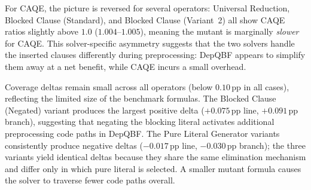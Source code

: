 For CAQE, the picture is reversed for several operators: Universal Reduction,
Blocked Clause (Standard), and Blocked Clause (Variant~2) all show CAQE ratios
slightly above $1.0$ ($1.004$--$1.005$), meaning the mutant is marginally
\emph{slower} for CAQE\@. This solver-specific asymmetry suggests that the two
solvers handle the inserted clauses differently during preprocessing: DepQBF
appears to simplify them away at a net benefit, while CAQE incurs a small
overhead.

Coverage deltas remain small across all operators (below $0.10\,\text{pp}$
in all cases), reflecting the limited size of the benchmark formulas.
The Blocked Clause (Negated) variant produces the largest positive delta
($+0.075\,\text{pp}$ line, $+0.091\,\text{pp}$ branch), suggesting that
negating the blocking literal activates additional preprocessing code paths
in DepQBF\@. The Pure Literal Generator variants consistently produce negative
deltas ($-0.017\,\text{pp}$ line, $-0.030\,\text{pp}$ branch); the three
variants yield identical deltas because they share the same elimination
mechanism and differ only in which pure literal is selected. A smaller
mutant formula causes the solver to traverse fewer code paths overall.